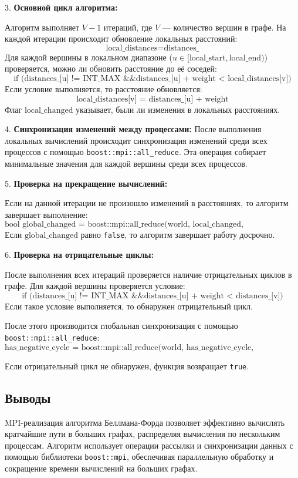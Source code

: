 \documentclass[12pt]{article}
\begin{document}
3. \textbf{Основной цикл алгоритма:}

   Алгоритм выполняет \(V-1\) итераций, где \(V\) — количество вершин в графе. На каждой итерации происходит обновление локальных расстояний:
   \[
   \text{local\_distances} = \text{distances\_}
   \]
   Для каждой вершины в локальном диапазоне (\(u \in [\text{local\_start}, \text{local\_end})\)) проверяется, можно ли обновить расстояние до её соседей:
   \[
   \text{if (distances\_[u] != INT\_MAX \&\& distances\_[u] + weight < local\_distances[v])}
   \]
   Если условие выполняется, то расстояние обновляется:
   \[
   \text{local\_distances[v] = distances\_[u] + weight}
   \]
   Флаг \(\text{local\_changed}\) указывает, были ли изменения в локальных расстояниях.

4. \textbf{Синхронизация изменений между процессами:}
   После выполнения локальных вычислений происходит синхронизация изменений среди всех процессов с помощью \texttt{boost::mpi::all\_reduce}.
   Эта операция собирает минимальные значения для каждой вершины среди всех процессов.
   
5. \textbf{Проверка на прекращение вычислений:}

   Если на данной итерации не произошло изменений в расстояниях, то алгоритм завершает выполнение:
   \[
   \text{bool global\_changed = boost::mpi::all\_reduce(world, local\_changed, std::logical\_or<>())}
   \]
   Если \(\text{global\_changed}\) равно \texttt{false}, то алгоритм завершает работу досрочно.

6. \textbf{Проверка на отрицательные циклы:}

   После выполнения всех итераций проверяется наличие отрицательных циклов в графе. Для каждой вершины проверяется условие:
   \[
   \text{if (distances\_[u] != INT\_MAX \&\& distances\_[u] + weight < distances\_[v])}
   \]
   Если такое условие выполняется, то обнаружен отрицательный цикл.

   После этого производится глобальная синхронизация с помощью \texttt{boost::mpi::all\_reduce}:
   \[
   \text{has\_negative\_cycle = boost::mpi::all\_reduce(world, has\_negative\_cycle, std::logical\_or<>())}
   \]

   Если отрицательный цикл не обнаружен, функция возвращает \texttt{true}.
\subsection{Выводы}

MPI-реализация алгоритма Беллмана-Форда позволяет эффективно вычислять кратчайшие пути в больших графах, распределяя вычисления по нескольким процессам. Алгоритм использует операции рассылки и синхронизации данных с помощью библиотеки \texttt{boost::mpi}, обеспечивая параллельную обработку и сокращение времени вычислений на больших графах.
\end{document}
